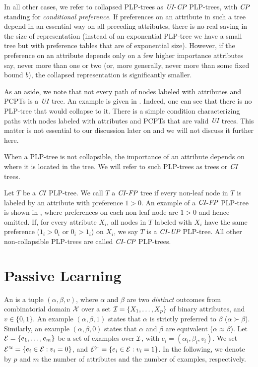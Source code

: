 In all other cases, we refer to collapsed PLP-trees as $\textit{UI}$-$\textit{CP}$ PLP-trees, 
with $\textit{CP}$ standing for \emph{conditional preference}. If preferences on 
an attribute in such a tree depend in an essential way on all preceding 
attributes, there is no real saving in the size of representation (instead 
of an exponential PLP-tree we have a small tree but with preference 
tables that are of exponential size). However, if the preference on an 
attribute depends only on a few higher importance attributes say, never more than 
one or two (or, more generally, never more than some fixed bound $b$), 
the collapsed representation is significantly smaller.

As an aside, we note that not every path of nodes labeled with attributes
and PCPTs is a $\textit{UI}$ tree. An example is given in .
Indeed, one can see that there is no PLP-tree that would collapse to 
it. There is a simple condition 
characterizing paths with nodes labeled with attributes and PCPTs that
are valid $\textit{UI}$ trees. This matter is not essential to our discussion later 
on and we will not discuss it further here.  
 
When a PLP-tree is not collapsible, the importance of an attribute depends
on where it is located in the tree. We will refer to such PLP-trees as
 trees or $\textit{CI}$ trees.

Let $T$ be a $\textit{CI}$ PLP-tree.
We call $T$ a $\textit{CI}$-$\textit{FP}$ tree if every non-leaf node in $T$
is labeled by an attribute with preference $1>0$.
An example of a $\textit{CI}$-$\textit{FP}$ PLP-tree is shown in , where
preferences on each non-leaf node are $1>0$ and hence omitted.
If, for every attribute $X_i$, all nodes in $T$ labeled with $X_i$
have the same preference ($1_i>0_i$ or $0_i>1_i$) on $X_i$, we say $T$ is
a $\textit{CI}$-$\textit{UP}$ PLP-tree.  
All other non-collapsible PLP-trees are called $\textit{CI}$-$\textit{CP}$ PLP-trees.


\section{Passive Learning}

An  is a tuple $(\alpha, \beta, v)$, where $\alpha$ and 
$\beta$ are two \emph{distinct} outcomes from combinatorial domain 
$\mathcal{X}$ over a set $\mathcal{I}=\{X_1,\ldots,
X_p\}$ of binary attributes, and $v \in \{0,1\}$. An example $(\alpha,\beta,1)$
states that $\alpha$ is strictly preferred to $\beta$ ($\alpha \succ \beta$).
Similarly, an example $(\alpha,\beta,0)$ states that $\alpha$ and $\beta$ 
are equivalent ($\alpha\approx\beta$). Let $\mathcal{E}=\{e_1,\ldots,e_m\}$ be a set 
of examples over $\mathcal{I}$, with $e_i=(\alpha_i,\beta_i,v_i)$. We set 
$\mathcal{E}^{\approx}= \{e_i \in \mathcal{E}: v_i=0\}$, and $\mathcal{E}^{\succ}= \{e_i \in \mathcal{E}: 
v_i =1\}$. 
In the following, we denote by $p$ and $m$ the number of attributes and the number of
examples, respectively.

